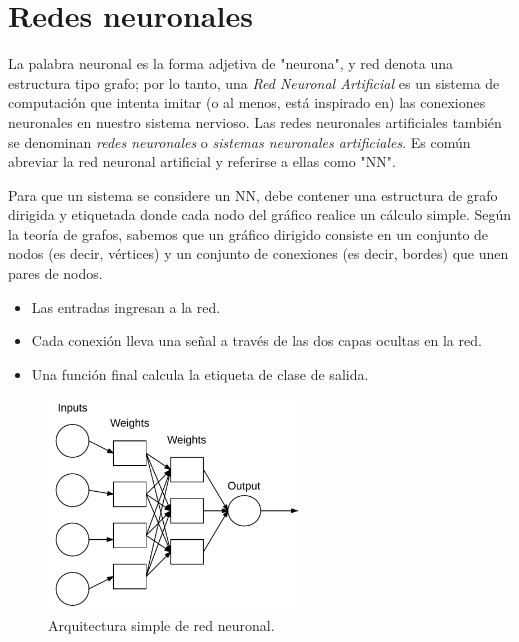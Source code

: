 \documentclass[a4paper,12pt]{article}
\begin{document}
\section{Redes neuronales}
La palabra neuronal es la forma adjetiva de "neurona", y red denota una estructura tipo grafo; por lo tanto, una \textit{Red Neuronal Artificial} es un sistema de computación que intenta imitar (o al menos, está inspirado en) las conexiones neuronales en nuestro sistema nervioso. Las redes neuronales artificiales también se denominan \textit{redes neuronales} o \textit{sistemas neuronales artificiales}. Es común abreviar la red neuronal artificial y referirse a ellas como "NN". \citep{rosebrock2017deep}

Para que un sistema se considere un NN, debe contener una estructura de grafo dirigida y etiquetada donde cada nodo del gráfico realice un cálculo simple. Según la teoría de grafos, sabemos que un gráfico dirigido consiste en un conjunto de nodos (es decir, vértices) y un conjunto de conexiones (es decir, bordes) que unen pares de nodos.

\begin{itemize}[noitemsep, topsep=2pt]
\item Las entradas ingresan a la red. 
\item Cada conexión lleva una señal a través de las dos capas ocultas en la red. 
\item Una función final calcula la etiqueta de clase de salida.
\end{itemize}

\begin{figure}[H]
	\begin{center}				
	\includegraphics[width=0.6\textwidth]{018.png}
  	\caption{Arquitectura simple de red neuronal. \cite{matich}}
  	\label{fig:nn}
  	\end{center}
\end{figure}
\end{document}
